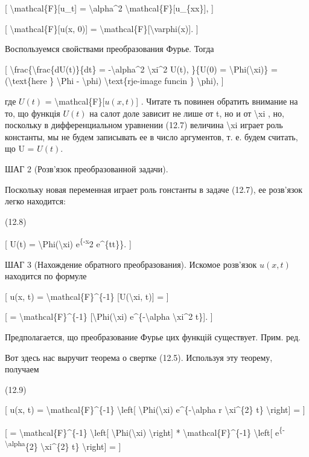 \documentclass[
]{article}
\begin{document}
{[} \textbackslash mathcal\{F\}{[}u\_t{]} = \textbackslash alpha\^{}2
\textbackslash mathcal\{F\}{[}u\_\{xx\}{]}, {]}

{[} \textbackslash mathcal\{F\}{[}u(x, 0){]} =
\textbackslash mathcal\{F\}{[}\textbackslash varphi(x){]}. {]}

Воспользуемся свойствами преобразования Фурье. Тогда

{[} \textbackslash frac\{\textbackslash frac\{dU(t)\}\{dt\} =
-\textbackslash alpha\^{}2 \textbackslash xi\^{}2 U(t), \}\{U(0) =
\textbackslash Phi(\textbackslash xi)\} = (\textbackslash text\{here \}
\textbackslash Phi - \textbackslash phi) \textbackslash text\{rje-image
funcin \} \textbackslash phi), {]}

где \(U(t)\) = \textbackslash mathcal\{F\}{[}\(u(x, t)\){]} . Читате ть
повинен обратить внимание на то, що функція \(U(t)\) на салот доле
зависит не лише от t, но и от \textbackslash xi , но, поскольку в
дифференциальном уравнении (12.7) величина \textbackslash xi играет роль
константы, мы не будем записывать ее в число аргументов, т. е. будем
считать, що U = \(U(t)\).

ШАГ 2 (Розв'язок преобразованной задачи).

Поскольку новая переменная играет роль гонстанты в задаче (12.7), ее
розв'язок легко находится:

(12.8)

{[} U(t) = \textbackslash Phi(\textbackslash xi)
e\textsuperscript{\{-x}2 e\^{}\{tt\}\}. {]}

ШАГ 3 (Нахождение обратного преобразования). Искомое розв'язок
\(u(x, t)\) находится по формуле

{[} u(x, t) = \textbackslash mathcal\{F\}\^{}\{-1\}
{[}U(\textbackslash xi, t){]} = {]}

{[} = \textbackslash mathcal\{F\}\^{}\{-1\}
{[}\textbackslash Phi(\textbackslash xi) e\^{}\{-\textbackslash alpha
\textbackslash xi\^{}2 t\}{]}. {]}

Предполагается, що преобразование Фурье цих функцій существует. Прим.
ред.

Вот здесь нас выручит теорема о свертке (12.5). Используя эту теорему,
получаем

(12.9)

{[} u(x, t) = \textbackslash mathcal\{F\}\^{}\{-1\}
\textbackslash left{[} \textbackslash Phi(\textbackslash xi)
e\^{}\{-\textbackslash alpha r \textbackslash xi\^{}\{2\} t\}
\textbackslash right{]} = {]}

{[} = \textbackslash mathcal\{F\}\^{}\{-1\} \textbackslash left{[}
\textbackslash Phi(\textbackslash xi) \textbackslash right{]} *
\textbackslash mathcal\{F\}\^{}\{-1\} \textbackslash left{[}
e\textsuperscript{\{-\textbackslash alpha}\{2\}
\textbackslash xi\^{}\{2\} t\} \textbackslash right{]} = {]}
\end{document}
